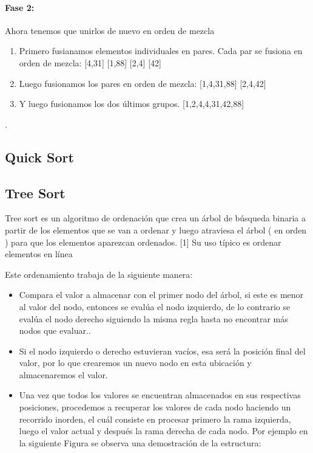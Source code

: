 \documentclass{article}
\begin{document}
    \paragraph{Fase 2:} Ahora tenemos que unirlos de nuevo en orden de mezcla
\begin{enumerate}
    \item Primero fusianamos elementos individuales en pares. Cada par se fusiona en orden de mezcla: [4,31] [1,88] [2,4] [42]
    \item Luego fusionamos los pares en orden de mezcla: [1,4,31,88] [2,4,42]
    \item Y luego fusionamos los dos últimos grupos. [1,2,4,4,31,42,88]
\end{enumerate}    


.
    \subsection{Quick Sort}
    
    
    \subsection{Tree Sort}
    
     Tree sort es un algoritmo de ordenación que crea un árbol de búsqueda binaria a partir de los elementos que se van a ordenar y luego atraviesa el árbol ( en orden ) para que los elementos aparezcan ordenados. [1] Su uso típico es ordenar elementos en línea 
     
     Este ordenamiento trabaja de la siguiente manera:
     \begin{itemize}
            \item Compara el valor a almacenar con el primer nodo del árbol, si este es menor al valor del nodo, entonces se evalúa el nodo izquierdo, de lo contrario se evalúa el nodo derecho siguiendo la misma regla hasta no encontrar más nodos que evaluar..

            \item Si el nodo izquierdo o derecho estuvieran vacíos, esa será la posición final del valor, por lo que crearemos un nuevo nodo en esta ubicación y almacenaremos el valor.
            
            \item Una vez que todos los valores se encuentran almacenados en sus respectivas posiciones, procedemos a recuperar los valores de cada nodo haciendo un recorrido inorden, el cuál consiste en procesar primero la rama izquierda, luego el valor actual y después la rama derecha de cada nodo.
    Por ejemplo en la siguiente Figura se observa una demostración de la estructura:
        
        \end{itemize}
        
\end{document}
